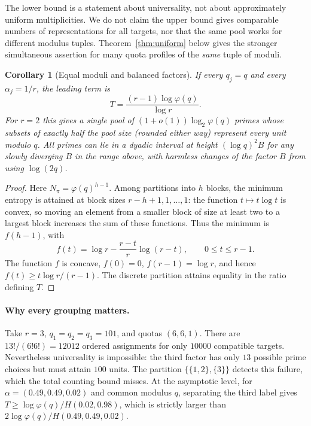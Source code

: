 \documentclass[11pt]{article}
\newtheorem{corollary}[theorem]{Corollary}
\theoremstyle{definition}\newtheorem{remark}[theorem]{Remark}
\begin{document}
The lower bound is a statement about universality, not about approximately uniform multiplicities. We do not claim the upper bound gives comparable numbers of representations for all targets, nor that the same pool works for different modulus tuples. Theorem~\ref{thm:uniform} below gives the stronger simultaneous assertion for many quota profiles of the \emph{same} tuple of moduli.

\begin{corollary}[Equal moduli and balanced factors]\label{cor:equal}
If every $q_j=q$ and every $\alpha_j=1/r$, the leading term is
\[
 T=\frac{(r-1)\log\varphi(q)}{\log r}.
\]
For $r=2$ this gives a single pool of $(1+o(1))\log_2\varphi(q)$ primes whose subsets of exactly half the pool size (rounded either way) represent every unit modulo $q$. All primes can lie in a dyadic interval at height $(\log q)^2 B$ for any slowly diverging $B$ in the range above, with harmless changes of the factor $B$ from using $\log(2q)$.
\end{corollary}
\begin{proof}
Here $N_\pi=\varphi(q)^{h-1}$. Among partitions into $h$ blocks, the minimum entropy is attained at block sizes $r-h+1,1,\dots,1$: the function $t\mapsto t\log t$ is convex, so moving an element from a smaller block of size at least two to a largest block increases the sum of these functions. Thus the minimum is $f(h-1)$, with
\[
 f(t)=\log r-\frac{r-t}{r}\log(r-t),\qquad 0\le t\le r-1.
\]
The function $f$ is concave, $f(0)=0$, $f(r-1)=\log r$, and hence $f(t)\ge t\log r/(r-1)$. The discrete partition attains equality in the ratio defining $T$.
\end{proof}

\paragraph{Why every grouping matters.}
Take $r=3$, $q_1=q_2=q_3=101$, and quotas $(6,6,1)$. There are $13!/(6!6!)=12012$ ordered assignments for only $10000$ compatible targets. Nevertheless universality is impossible: the third factor has only $13$ possible prime choices but must attain $100$ units. The partition $\{\{1,2\},\{3\}\}$ detects this failure, which the total counting bound misses. At the asymptotic level, for $\alpha=(0.49,0.49,0.02)$ and common modulus $q$, separating the third label gives $T\ge \log\varphi(q)/H(0.02,0.98)$, which is strictly larger than $2\log\varphi(q)/H(0.49,0.49,0.02)$.
\end{document}
